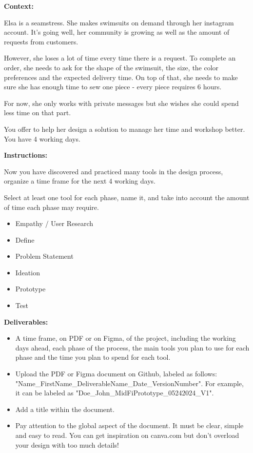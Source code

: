 \makeheaderfiles

\textbf{Context:}

Elsa is a seamstress. She makes swimsuits on demand through her instagram account. It's going well, her community is growing as well as the amount of requests from customers.

However, she loses a lot of time every time there is a request. To complete an order, she needs to ask for the shape of the swimsuit, the size, the color preferences and the expected delivery time. On top of that, she needs to make sure she has enough time to sew one piece - every piece requires 6 hours.

For now, she only works with private messages but she wishes she could spend less time on that part.

You offer to help her design a solution to manage her time and workshop better. You have 4 working days.

\textbf{Instructions:}

Now you have discovered and practiced many tools in the design process, organize a time frame for the next 4 working days.

Select at least one tool for each phase, name it, and take into account the amount of time each phase may require.

\begin{itemize}
\item Empathy / User Research
\item Define
\item Problem Statement
\item Ideation
\item Prototype
\item Test
\end{itemize}

\textbf{Deliverables:}

\begin{itemize}
\item A time frame, on PDF or on Figma, of the project, including the working days ahead, each phase of the process, the main tools you plan to use for each phase and the time you plan to spend for each tool.
\item Upload the PDF or Figma document on Github, labeled as follows: "Name\_FirstName\_DeliverableName\_Date\_VersionNumber". For example, it can be labeled as "Doe\_John\_MidFiPrototype\_05242024\_V1".
\item Add a title within the document.
\item Pay attention to the global aspect of the document. It must be clear, simple and easy to read. You can get inspiration on canva.com but don't overload your design with too much details!
\end{itemize}

